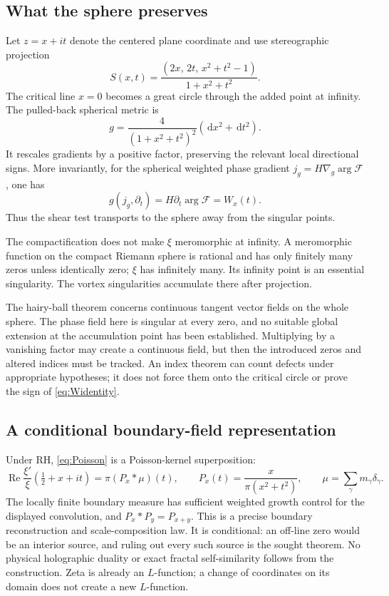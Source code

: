 \documentclass[11pt,letterpaper]{article}
\numberwithin{equation}{section}
\theoremstyle{definition}
\theoremstyle{remark}
\newcommand{\dd}{\,\mathrm d}
\newcommand{\Repart}{\operatorname{Re}}
\begin{document}
\subsection{What the sphere preserves}
Let $z=x+it$ denote the centered plane coordinate and use stereographic projection
\begin{equation}\label{eq:sphere}
S(x,t)=\frac{(2x,\,2t,\,x^2+t^2-1)}{1+x^2+t^2}.
\end{equation}
The critical line $x=0$ becomes a great circle through the added point at infinity. The pulled-back spherical metric is
\begin{equation}\label{eq:metric}
g=\frac{4}{(1+x^2+t^2)^2}(\dd x^2+\dd t^2).
\end{equation}
It rescales gradients by a positive factor, preserving the relevant local directional signs. More invariantly, for the spherical weighted phase gradient $j_g=H\nabla_g\arg\mathcal F$, one has
\[
g(j_g,\partial_t)=H\partial_t\arg\mathcal F=W_x(t).
\]
Thus the shear test transports to the sphere away from the singular points.

The compactification does not make $\xi$ meromorphic at infinity. A meromorphic function on the compact Riemann sphere is rational and has only finitely many zeros unless identically zero; $\xi$ has infinitely many. Its infinity point is an essential singularity. The vortex singularities accumulate there after projection.

The hairy-ball theorem concerns continuous tangent vector fields on the whole sphere. The phase field here is singular at every zero, and no suitable global extension at the accumulation point has been established. Multiplying by a vanishing factor may create a continuous field, but then the introduced zeros and altered indices must be tracked. An index theorem can count defects under appropriate hypotheses; it does not force them onto the critical circle or prove the sign of \eqref{eq:Widentity}.

\subsection{A conditional boundary-field representation}
Under RH, \eqref{eq:Poisson} is a Poisson-kernel superposition:
\[
\Repart\frac{\xi'}{\xi}(\tfrac12+x+it)
=\pi(P_x*\mu)(t),\qquad
P_x(t)=\frac{x}{\pi(x^2+t^2)},\qquad
\mu=\sum_\gamma m_\gamma\delta_\gamma.
\]
The locally finite boundary measure has sufficient weighted growth control for the displayed convolution, and $P_x*P_y=P_{x+y}$. This is a precise boundary reconstruction and scale-composition law. It is conditional: an off-line zero would be an interior source, and ruling out every such source is the sought theorem. No physical holographic duality or exact fractal self-similarity follows from the construction. Zeta is already an $L$-function; a change of coordinates on its domain does not create a new $L$-function.
\end{document}
